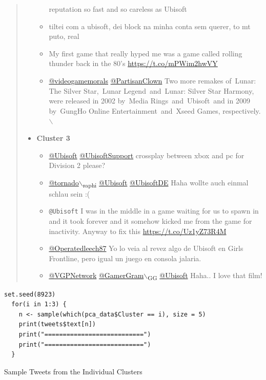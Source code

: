 \documentclass[11pt]{article}
\begin{document}
\begin{quote}
\begin{itemize}
\begin{itemize}
reputation so fast and so careless as Ubisoft
\item tiltei com a ubisoft, dei block na minha conta sem querer, to mt puto, real
\item My first game that really hyped me was a game called rolling thunder back in
the 80’s \url{https://t.co/mPWim2hwVY}
\item \href{https://twitter.com/search?q=\%40videogamemorals}{@videogamemorals} \href{https://twitter.com/search?q=\%40PartisanClown}{@PartisanClown} Two more remakes of Lunar: The Silver
Star, Lunar Legend and Lunar: Silver Star Harmony, were released in 2002
by Media Rings and Ubisoft and in 2009 by GungHo Online
Entertainment and Xseed Games, respectively.$\backslash$
\end{itemize}
\item \textbf{Cluster 3}
\begin{itemize}
\item \href{https://twitter.com/search?q=\%40Ubisoft}{@Ubisoft} \href{https://twitter.com/search?q=\%40UbisoftSupport}{@UbisoftSupport} crossplay between xbox and pc for Division 2
please?
\item \href{https://twitter.com/search?q=\%40tornado\_raphi}{@tornado$\backslash$\textsubscript{raphi}} \href{https://twitter.com/search?q=\%40Ubisoft}{@Ubisoft} \href{https://twitter.com/search?q=\%40UbisoftDE}{@UbisoftDE} Haha wollte auch einmal schlau sein
:(
\item \texttt{@Ubisoft} I was in the middle in a game waiting for us to spawn in and it
took forever and it somehow kicked me from the game for inactivity. Anyway to
fix this \url{https://t.co/Uz1yZ73R4M}
\item \href{https://twitter.com/search?q=\%40Operatedleech87}{@Operatedleech87} Yo lo veia al revez algo de Ubisoft en Girls Frontline,
pero igual un juego en consola jalaria.
\item \href{https://twitter.com/search?q=\%40VGPNetwork}{@VGPNetwork} \href{https://twitter.com/search?q=\%40GamerGram\_GG}{@GamerGram$\backslash$\textsubscript{GG}} \href{https://twitter.com/search?q=\%40Ubisoft}{@Ubisoft} Haha.. I love that film!
\end{itemize}
\end{itemize}
\end{quote}


\begin{listing}[htbp]
\begin{verbatim}
set.seed(8923)
  for(i in 1:3) {
    n <- sample(which(pca_data$Cluster == i), size = 5)
    print(tweets$text[n])
    print("===========================")
    print("===========================")
  }
\end{verbatim}
\caption{\label{org894868e}Sample Tweets from the Individual Clusters}
\end{listing}
\end{document}
